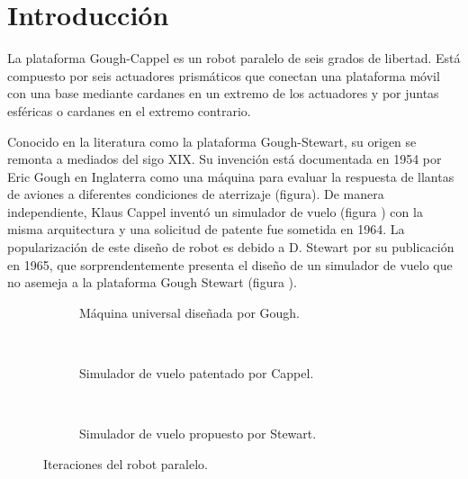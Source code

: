 \section{Introducción}

La plataforma Gough-Cappel es un robot paralelo de seis grados de libertad.
Está compuesto por seis actuadores prismáticos que conectan una plataforma
móvil con una base mediante cardanes en un extremo de los actuadores y por
juntas esféricas o cardanes en el extremo contrario. 


Conocido en la literatura como la 
plataforma Gough-Stewart, su origen se remonta a mediados del sigo XIX.
Su invención está documentada en 1954 por Eric Gough 
\cite{gough} en Inglaterra como una máquina para 
evaluar la respuesta de llantas de aviones a diferentes 
condiciones de aterrizaje (figura). 
De manera independiente, Klaus Cappel inventó un simulador de vuelo (figura )
con la misma arquitectura y una solicitud de patente 
fue sometida en 1964.
La popularización de este diseño de robot es debido a D. Stewart 
por su publicación en 1965, que sorprendentemente presenta el
diseño de un simulador de vuelo que no asemeja a la 
plataforma Gough Stewart (figura ).



\begin{figure}[hb!]
    \centering
    \begin{subfigure}[b]{0.3\textwidth}
        \caption{Máquina universal diseñada por Gough.}
        \label{fig: gough robot}
    \end{subfigure}
    ~ %
    \begin{subfigure}[b]{0.3\textwidth}
        \caption{Simulador de vuelo patentado por Cappel.}
        \label{fig: cappel robot}
    \end{subfigure}
    ~ %
    \begin{subfigure}[b]{0.3\textwidth}
        \caption{Simulador de vuelo propuesto por Stewart.}
        \label{fig: stewart robot}
    \end{subfigure}
    \caption{Iteraciones del robot paralelo.}\label{fig: parallel robots}
\end{figure}


